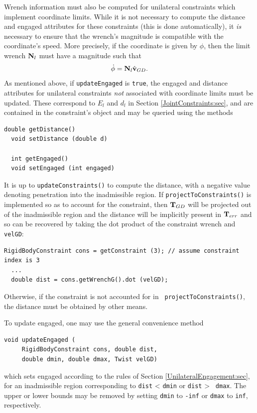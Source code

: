 Wrench information must also be computed for unilateral constraints
which implement coordinate limits. While it is not necessary to
compute the {\sf distance} and {\sf engaged} attributes for these
constraints (this is done automatically), it {\it is} necessary to
ensure that the wrench's magnitude is compatible with the coordinate's
speed. More precisely, if the coordinate is given by $\phi$, then the
limit wrench ${\bf N}_l$ must have a magnitude such that
%
\begin{equation}
\dot\phi = {\bf N}_l \hat{{\bf v}}_{GD}.
\end{equation}
%
As mentioned above, if {\tt updateEngaged} is {\tt true}, the {\sf
engaged} and {\sf distance} attributes for unilateral constraints {\it not}
associated with coordinate limits must be updated.  These correspond
to $E_l$ and $d_l$ in Section \ref{JointConstraints:sec}, and are
contained in the constraint's
 object and may
be queried using the methods
\begin{lstlisting}[]
  double getDistance()
  void setDistance (double d)

  int getEngaged()
  void setEngaged (int engaged)
\end{lstlisting}
%
It is up to {\tt updateConstraints()} to compute the distance, with
a negative value denoting penetration into the inadmissible
region. If {\tt projectToConstraints()} is
implemented so as to account for the constraint, then ${\bf T}_{GD}$ will
be projected out of the inadmissible region and the distance will be
implicitly present in ${\bf T}_{err}$ and so can be recovered by taking
the dot product of the constraint wrench and {\tt velGD}:
%
\begin{lstlisting}[]
  RigidBodyConstraint cons = getConstraint (3); // assume constraint index is 3
  ...
  double dist = cons.getWrenchG().dot (velGD);
\end{lstlisting}
%
Otherwise, if the constraint is not accounted for in {\tt
projectToConstraints()}, the distance must be obtained by other means.

To update {\sf engaged}, one may use the general convenience method
%
\begin{lstlisting}[]
  void updateEngaged (
     RigidBodyConstraint cons, double dist, 
     double dmin, double dmax, Twist velGD)
\end{lstlisting}
%
which sets {\sf engaged} according to the rules of Section
\ref{UnilateralEngagement:sec}, for an inadmissible region
corresponding to {\tt dist} < {\tt dmin} or {\tt dist} > {\tt
dmax}. The upper or lower bounds may be removed by setting {\tt dmin}
to {\tt -inf} or {\tt dmax} to {\tt inf}, respectively.

